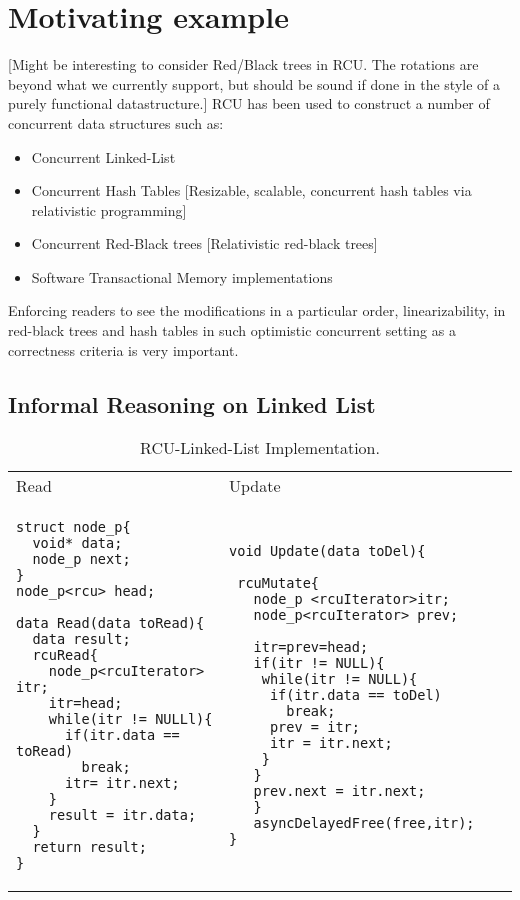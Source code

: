 \documentclass{article}
\begin{document}
\section{Motivating example}

[Might be interesting to consider Red/Black trees in RCU.  The rotations are beyond what we currently support, but should be sound if done in the style of a purely functional datastructure.]
RCU has been used to construct a number of concurrent data structures such as:
\begin{itemize}
\item Concurrent Linked-List
\item Concurrent Hash Tables [Resizable, scalable, concurrent hash tables via relativistic programming]
\item Concurrent Red-Black trees [Relativistic red-black trees]
\item Software Transactional Memory implementations
\end{itemize}
Enforcing readers to see the modifications in a particular order, linearizability,  in red-black trees and hash tables in such optimistic concurrent setting as a correctness criteria is very important. 
\subsection{Informal Reasoning on Linked List}
\begin{table}[]
	\begin{tabular}{|p{7cm}|p{7cm}|}
		Read & Update \\
		
\begin{lstlisting}
struct node_p{
  void* data;
  node_p next;
}		
node_p<rcu> head;
	
data Read(data toRead){
  data result;	
  rcuRead{
    node_p<rcuIterator> itr; 
    itr=head;     
    while(itr != NULLl){
      if(itr.data == toRead)
	    break;
	  itr= itr.next;
    }
    result = itr.data;
  }
  return result;
}
		\end{lstlisting} &
		
		\begin{lstlisting}
void Update(data toDel){

 rcuMutate{
   node_p <rcuIterator>itr;
   node_p<rcuIterator> prev;

   itr=prev=head;    
   if(itr != NULL){
    while(itr != NULL){
     if(itr.data == toDel)
       break;
     prev = itr;
     itr = itr.next;
    }
   }
   prev.next = itr.next;    
   }		
   asyncDelayedFree(free,itr);			
}
		\end{lstlisting} 
	\end{tabular}
	
	\caption{RCU-Linked-List Implementation.}
	\label{tab:rculist}
\end{table}
\end{document}
